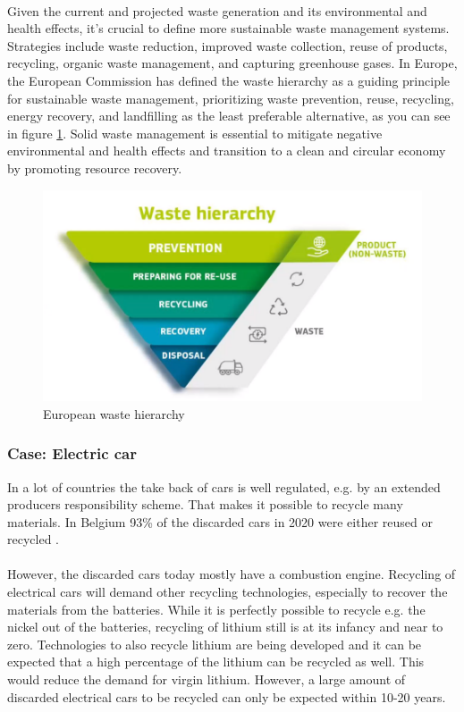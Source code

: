 \documentclass[../summary.tex]{subfiles}
\begin{document}
\\
Given the current and projected waste generation and its environmental and health effects, it's crucial to define more sustainable waste management systems. Strategies include waste reduction, improved waste collection, reuse of products, recycling, organic waste management, and capturing greenhouse gases. In Europe, the European Commission has defined the waste hierarchy as a guiding principle for sustainable waste management, prioritizing waste prevention, reuse, recycling, energy recovery, and landfilling as the least preferable alternative, as you can see in figure \ref{fig:wastehierarchy}. Solid waste management is essential to mitigate negative environmental and health effects and transition to a clean and circular economy by promoting resource recovery.

\begin{figure}[H]
	\centering
	\includegraphics[width=0.8\linewidth]{../images/waste_hierarchy}
	\caption{European waste hierarchy}
	\label{fig:wastehierarchy}
\end{figure}
\newpage
\subsubsection{Case: Electric car}

In a lot of countries the take back of cars is well regulated, e.g. by an extended producers responsibility scheme. That makes it possible to recycle many materials. In Belgium 93\% of the discarded cars in 2020 were either reused or recycled . \\
\\
However, the discarded cars today mostly have a combustion engine. Recycling of electrical cars will demand other recycling technologies, especially to recover the materials from the batteries. While it is perfectly possible to recycle e.g. the nickel out of the batteries, recycling of lithium still is at its infancy and near to zero. Technologies to also recycle lithium are being developed and it can be expected that a high percentage of the lithium can be recycled as well. This would reduce the demand for virgin lithium. However, a large amount of discarded electrical cars to be recycled can only be expected within 10-20 years.
\end{document}
